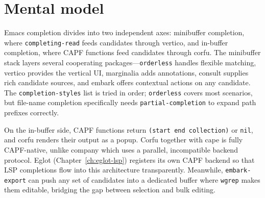 \section{Mental model}
Emacs completion divides into two independent axes: minibuffer completion, where \texttt{completing-read} feeds candidates through vertico, and in-buffer completion, where CAPF functions feed candidates through corfu.  The minibuffer stack layers several cooperating packages---\texttt{orderless} handles flexible matching, vertico provides the vertical UI, marginalia adds annotations, consult supplies rich candidate sources, and embark offers contextual actions on any candidate.  The \texttt{completion-styles} list is tried in order; \texttt{orderless} covers most scenarios, but file-name completion specifically needs \texttt{partial-completion} to expand path prefixes correctly.

On the in-buffer side, CAPF functions return \texttt{(start end collection)} or \texttt{nil}, and corfu renders their output as a popup.  Corfu together with cape is fully CAPF-native, unlike company which uses a parallel, incompatible backend protocol.  Eglot (Chapter~\ref{ch:eglot-lsp}) registers its own CAPF backend so that LSP completions flow into this architecture transparently.  Meanwhile, \texttt{embark-export} can push any set of candidates into a dedicated buffer where \texttt{wgrep} makes them editable, bridging the gap between selection and bulk editing.
